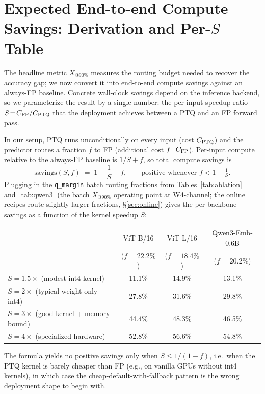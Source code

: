 \documentclass{article}
\makeatletter
\newcommand{\fp}{\textsc{FP}\xspace}
\newcommand{\ptq}{\textsc{PTQ}\xspace}
\newcommand{\xat}[1]{\ensuremath{X_{@#1\%}}}
\makeatother
\begin{document}
\section{Expected End-to-end Compute Savings: Derivation and Per-$S$ Table}\label{app:savings}

The headline metric \xat{90} measures the routing budget needed to recover the accuracy gap; we now convert it into end-to-end compute savings against an always-\fp{} baseline. Concrete wall-clock savings depend on the inference backend, so we parameterize the result by a single number: the per-input speedup ratio $S \!=\! C_{\fp{}} / C_{\ptq{}}$ that the deployment achieves between a \ptq{} and an \fp{} forward pass.

In our setup, \ptq{} runs unconditionally on every input (cost $C_{\ptq{}}$) and the predictor routes a fraction $f$ to \fp{} (additional cost $f \cdot C_{\fp{}}$). Per-input compute relative to the always-\fp{} baseline is $1/S + f$, so total compute savings is
\[
\mathrm{savings}(S, f) \;=\; 1 - \frac{1}{S} - f, \qquad \text{positive whenever } f < 1 - \tfrac{1}{S}.
\]
Plugging in the \texttt{q\_margin} batch routing fractions from Tables~\ref{tab:ablation} and~\ref{tab:qwen3} (the batch \xat{90} operating point at W4-channel; the online recipes route slightly larger fractions, \S\ref{sec:online}) gives the per-backbone savings as a function of the kernel speedup $S$:

\begin{center}
\small
\begin{tabular}{lccc}
\toprule
& ViT-B/16 & ViT-L/16 & Qwen3-Emb-0.6B \\
& ($f = 22.2\%$) & ($f = 18.4\%$) & ($f = 20.2\%$) \\
\midrule
$S = 1.5\times$ (modest int4 kernel)        & 11.1\% & 14.9\% & 13.1\% \\
$S = 2\times$  (typical weight-only int4)   & 27.8\% & 31.6\% & 29.8\% \\
$S = 3\times$  (good kernel + memory-bound) & 44.4\% & 48.3\% & 46.5\% \\
$S = 4\times$  (specialized hardware)       & 52.8\% & 56.6\% & 54.8\% \\
\bottomrule
\end{tabular}
\end{center}

The formula yields no positive savings only when $S \!\leq\! 1/(1-f)$, i.e.\ when the \ptq{} kernel is barely cheaper than \fp{} (e.g., on vanilla GPUs without int4 kernels), in which case the cheap-default-with-fallback pattern is the wrong deployment shape to begin with.
\end{document}
